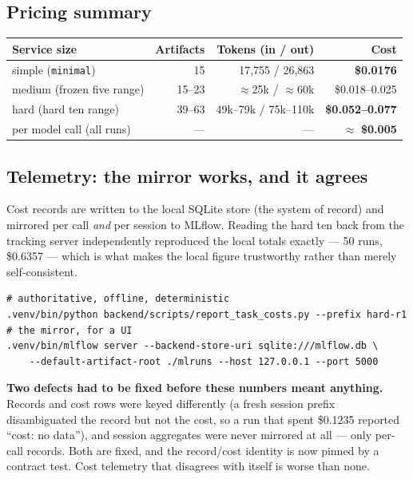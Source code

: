 \documentclass[11pt,a4paper]{article}
\begin{document}
\subsection{Pricing summary}

\begin{center}
\begin{tabular}{@{}lrrr@{}}
\toprule
\textbf{Service size} & \textbf{Artifacts} & \textbf{Tokens (in / out)} & \textbf{Cost} \\
\midrule
simple (\texttt{minimal}) & 15 & 17{,}755 / 26{,}863 & \textbf{\$0.0176} \\
medium (frozen five range) & 15--23 & $\approx$25k / $\approx$60k & \$0.018--0.025 \\
hard (hard ten range) & 39--63 & 49k--79k / 75k--110k & \textbf{\$0.052--0.077} \\
\midrule
per model call (all runs) & --- & --- & $\approx$ \textbf{\$0.005} \\
\bottomrule
\end{tabular}
\end{center}

\subsection{Telemetry: the mirror works, and it agrees}

Cost records are written to the local SQLite store (the system of record) and
mirrored per call \emph{and} per session to MLflow. Reading the hard ten back from
the tracking server independently reproduced the local totals exactly --- 50 runs,
\$0.6357 --- which is what makes the local figure trustworthy rather than merely
self-consistent.

\begin{lstlisting}
# authoritative, offline, deterministic
.venv/bin/python backend/scripts/report_task_costs.py --prefix hard-r1
# the mirror, for a UI
.venv/bin/mlflow server --backend-store-uri sqlite:///mlflow.db \
    --default-artifact-root ./mlruns --host 127.0.0.1 --port 5000
\end{lstlisting}

\begin{notebox}[colframe=warn]
\textbf{Two defects had to be fixed before these numbers meant anything.} Records and
cost rows were keyed differently (a fresh session prefix disambiguated the record but
not the cost, so a run that spent \$0.1235 reported ``cost: no data''), and session
aggregates were never mirrored at all --- only per-call records. Both are fixed, and
the record/cost identity is now pinned by a contract test. Cost telemetry that
disagrees with itself is worse than none.
\end{notebox}
\end{document}
